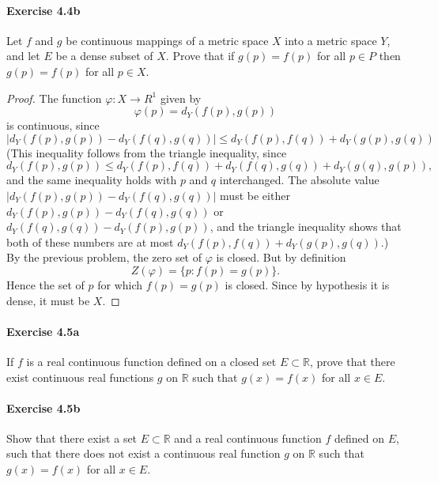 \documentclass{article}
\theoremstyle{definition}
\begin{document}
\paragraph{Exercise 4.4b} Let $f$ and $g$ be continuous mappings of a metric space $X$ into a metric space $Y$, and let $E$ be a dense subset of $X$. Prove that if $g(p) = f(p)$ for all $p \in P$ then $g(p) = f(p)$ for all $p \in X$.
\begin{proof}
    The function $\varphi: X \rightarrow R^1$ given by
$$
\varphi(p)=d_Y(f(p), g(p))
$$
is continuous, since
$$
\left|d_Y(f(p), g(p))-d_Y(f(q), g(q))\right| \leq d_Y(f(p), f(q))+d_Y(g(p), g(q))
$$
(This inequality follows from the triangle inequality, since
$$
d_Y(f(p), g(p)) \leq d_Y(f(p), f(q))+d_Y(f(q), g(q))+d_Y(g(q), g(p)),
$$
and the same inequality holds with $p$ and $q$ interchanged. The absolute value $\left|d_Y(f(p), g(p))-d_Y(f(q), g(q))\right|$ must be either $d_Y(f(p), g(p))-d_Y(f(q), g(q))$ or $d_Y(f(q), g(q))-d_Y(f(p), g(p))$, and the triangle inequality shows that both of these numbers are at most $d_Y(f(p), f(q))+d_Y(g(p), g(q))$.)
By the previous problem, the zero set of $\varphi$ is closed. But by definition
$$
Z(\varphi)=\{p: f(p)=g(p)\} .
$$
Hence the set of $p$ for which $f(p)=g(p)$ is closed. Since by hypothesis it is dense, it must be $X$.
\end{proof}


\paragraph{Exercise 4.5a} If $f$ is a real continuous function defined on a closed set $E \subset \mathbb{R}$, prove that there exist continuous real functions $g$ on $\mathbb{R}$ such that $g(x)=f(x)$ for all $x \in E$.

\paragraph{Exercise 4.5b} Show that there exist a set $E \subset \mathbb{R}$ and a real continuous function $f$ defined on $E$, such that there does not exist a continuous real function $g$ on $\mathbb{R}$ such that $g(x)=f(x)$ for all $x \in E$.
\end{document}
